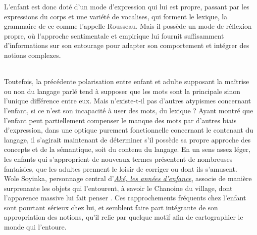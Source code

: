 \documentclass[a4paper,french,bookmarks]{article}
\begin{document}
\qquad L'enfant est donc doté d'un mode d'expression qui lui est propre, passant par les expressions du corps et une variété de vocalises, qui forment le lexique, la grammaire de ce  comme l'appelle Rousseau. Mais il possède un mode de réflexion propre, où l'approche sentimentale et empirique lui fournit suffisamment d'informations sur son entourage pour adapter son comportement et intégrer des notions complexes.  

\text{}\\[20pt]

\qquad Toutefois, la précédente polarisation entre enfant et adulte supposant la maîtrise ou non du langage parlé tend à supposer que les mots sont la principale sinon l'unique différence entre eux. Mais n'existe-t-il pas d'autres atypismes concernant l'enfant, si ce n'est son incapacité à user des mots, du lexique ? Ayant montré que l'enfant peut partiellement compenser le manque des mots par d'autres biais d'expression, dans une optique purement fonctionnelle concernant le contenant du langage, il s'agirait maintenant de déterminer s'il possède sa propre approche des concepts et de la sémantique, soit du contenu du langage. En un sens assez léger, les enfants qui s'approprient de nouveaux termes présentent de nombreuses fantaisies, que les adultes prennent le loisir de corriger ou dont ils s'amusent. Wole Soyinka, personnage central d'\underline{\itshape Aké, les années d'enfance}, associe de manière surprenante les objets qui l'entourent, à savoir le Chanoine du village, dont l'apparence massive lui fait penser . Ces rapprochements fréquents chez l'enfant sont pourtant sérieux chez lui, et semblent faire part intégrante de son appropriation des notions, qu'il relie par quelque motif afin de cartographier le monde qui l'entoure.  
\end{document}
